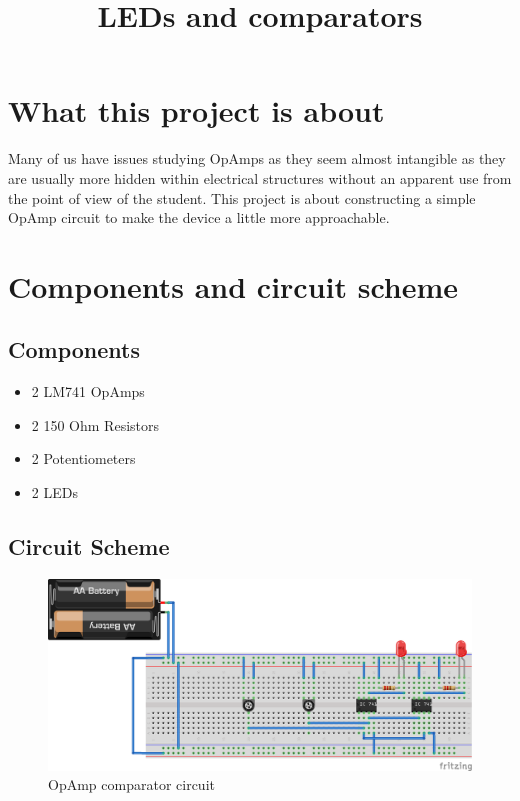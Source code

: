 \documentclass{article}
\date{\vspace{-5ex}}
\begin{document}
 	\title{LEDs and comparators}

	\maketitle
	\section{What this project is about}
	Many of us have issues studying OpAmps as they seem almost intangible
	as they are usually more hidden within electrical structures without
	an apparent use from the point of view of the student.
	This project is about constructing a simple OpAmp circuit to make the
	device a little more approachable.

	\section{Components and circuit scheme}
		\subsection{Components}
		\begin{itemize}
		\item 2 LM741 OpAmps
		\item 2 150 Ohm Resistors 
		\item 2 Potentiometers	
		\item 2 LEDs
		\end{itemize}

		\subsection{Circuit Scheme}
		\begin{figure}[H]
			\centering
			\includegraphics[scale=0.45]{circuit_bb}
			\caption{OpAmp comparator circuit \cite{circuit}}
		\end{figure}
\end{document}
